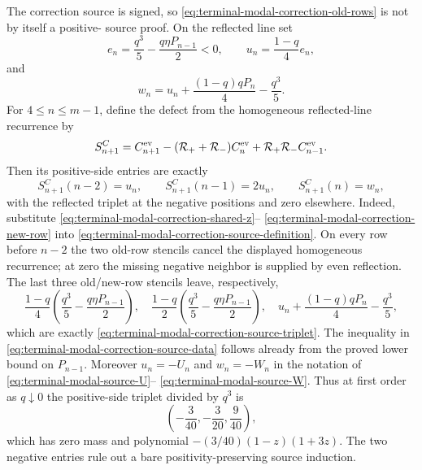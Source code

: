 The correction source is signed, so
\eqref{eq:terminal-modal-correction-old-rows} is not by itself a positive-
source proof.  On the reflected line set
\begin{equation}
 e_n=\frac{q^3}{5}-\frac{q\eta P_{n-1}}2<0,\qquad
 u_n=\frac{1-q}{4}e_n,
 \label{eq:terminal-modal-correction-source-data}
\end{equation}
and
\begin{equation}
 w_n=u_n+\frac{(1-q)qP_n}{4}-\frac{q^3}{5}.
 \label{eq:terminal-modal-correction-source-last}
\end{equation}
For $4\le n\le m-1$, define the defect from the homogeneous reflected-line
recurrence by
\begin{equation}
 S_{n+1}^C=C_{n+1}^{\rm ev}
 -(\mathcal R_++\mathcal R_-)C_n^{\rm ev}
 +\mathcal R_+\mathcal R_-C_{n-1}^{\rm ev}.
 \label{eq:terminal-modal-correction-source-definition}
\end{equation}
Then its positive-side entries are exactly
\begin{equation}
 S_{n+1}^C(n-2)=u_n,\qquad
 S_{n+1}^C(n-1)=2u_n,\qquad
 S_{n+1}^C(n)=w_n,
 \label{eq:terminal-modal-correction-source-triplet}
\end{equation}
with the reflected triplet at the negative positions and zero elsewhere.
Indeed, substitute
\eqref{eq:terminal-modal-correction-shared-z}--
\eqref{eq:terminal-modal-correction-new-row} into
\eqref{eq:terminal-modal-correction-source-definition}.  On every row before
$n-2$ the two old-row stencils cancel the displayed homogeneous recurrence;
at zero the missing negative neighbor is supplied by even reflection.  The
last three old/new-row stencils leave, respectively,
\[
 \frac{1-q}{4}\left(\frac{q^3}{5}-\frac{q\eta P_{n-1}}2\right),\quad
 \frac{1-q}{2}\left(\frac{q^3}{5}-\frac{q\eta P_{n-1}}2\right),\quad
 u_n+\frac{(1-q)qP_n}{4}-\frac{q^3}{5},
\]
which are exactly \eqref{eq:terminal-modal-correction-source-triplet}.
The inequality in
\eqref{eq:terminal-modal-correction-source-data} follows already from the
proved lower bound on $P_{n-1}$.  Moreover $u_n=-U_n$ and $w_n=-W_n$ in the
notation of \eqref{eq:terminal-modal-source-U}--
\eqref{eq:terminal-modal-source-W}.  Thus at first order as $q\downarrow0$
the positive-side triplet divided by $q^3$ is
\begin{equation}
 \left(-\frac3{40},-\frac3{20},\frac9{40}\right),
 \label{eq:terminal-modal-correction-leading-triplet}
\end{equation}
which has zero mass and polynomial
$-(3/40)(1-z)(1+3z)$.  The two negative entries rule out a bare
positivity-preserving source induction.

